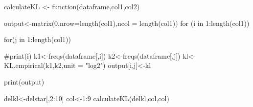 \documentclass{article}
\begin{document}

calculateKL <- function(dataframe,col1,col2){
  output<-matrix(0,nrow=length(col1),ncol = length(col1))
  for (i in 1:length(col1)){
    for(j in 1:length(col1)){
      #print(i)
      k1<-freqs(dataframe[,i])
      k2<-freqs(dataframe[,j])
      kl<-KL.empirical(k1,k2,unit = "log2")
      output[i,j]<-kl
      
    }
  }
  print(output)
}
delkl<-delstar[,2:10]
col<-1:9
calculateKL(delkl,col,col)
\end{document}
